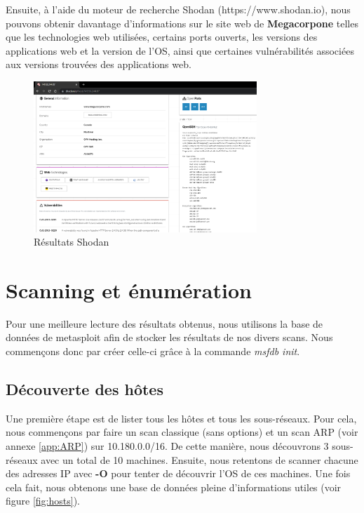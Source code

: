 \documentclass[a4paper]{article}
\begin{document}
Ensuite, à l'aide du moteur de recherche Shodan (https://www.shodan.io), nous pouvons obtenir davantage d'informations sur le site web de \textbf{Megacorpone} telles que les technologies web utilisées, certains ports ouverts, les versions des applications web et la version de l'OS, ainsi que certaines vulnérabilités associées aux versions trouvées des applications web. 
\begin{figure}[H]
    \centering
    \includegraphics[width=0.75\textwidth]{images/lab1/shodan.png}
    \caption{Résultats Shodan}
    \label{fig:shodan}
\end{figure}





















\newpage
\section{Scanning et énumération} \label{sec:scanning}
Pour une meilleure lecture des résultats obtenus, nous utilisons la base de données de metasploit afin de stocker les résultats de nos divers scans. Nous commençons donc par créer celle-ci grâce à la commande \emph{msfdb init}.

\subsection{Découverte des hôtes}
Une première étape est de lister tous les hôtes et tous les sous-réseaux. Pour cela, nous commençons par faire un scan classique (sans options) et un scan ARP (voir annexe \ref{app:ARP}) sur 10.180.0.0/16. De cette manière, nous découvrons 3 sous-réseaux avec un total de 10 machines. Ensuite, nous retentons de scanner chacune des adresses IP avec \textbf{-O} pour tenter de découvrir l'OS de ces machines. Une fois cela fait, nous obtenons une base de données pleine d'informations utiles (voir figure \ref{fig:hosts}).
\end{document}
